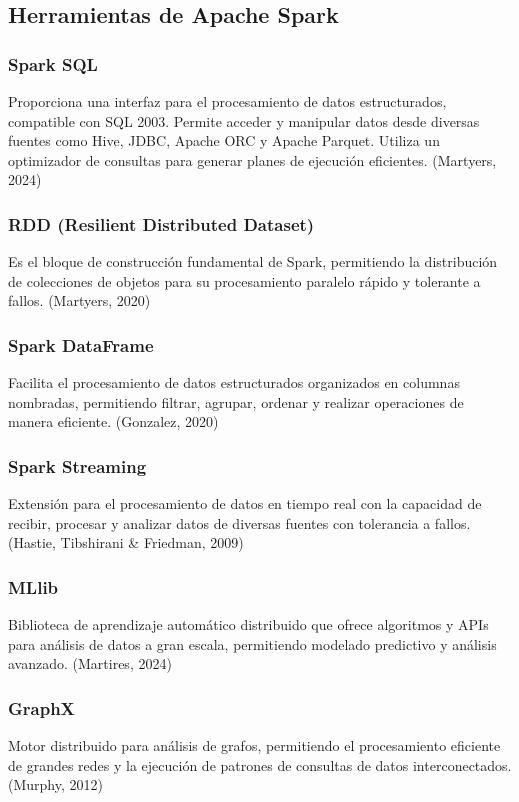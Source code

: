 	\subsection{Herramientas de Apache Spark}
	
	\subsubsection{Spark SQL}
	Proporciona una interfaz para el procesamiento de datos estructurados, compatible con SQL 2003. Permite acceder y manipular datos desde diversas fuentes como Hive, JDBC, Apache ORC y Apache Parquet. Utiliza un optimizador de consultas para generar planes de ejecución eficientes. (Martyers, 2024)
	
	\subsubsection{RDD (Resilient Distributed Dataset)}
	Es el bloque de construcción fundamental de Spark, permitiendo la distribución de colecciones de objetos para su procesamiento paralelo rápido y tolerante a fallos. (Martyers, 2020)
	
	\subsubsection{Spark DataFrame}
	Facilita el procesamiento de datos estructurados organizados en columnas nombradas, permitiendo filtrar, agrupar, ordenar y realizar operaciones de manera eficiente. (Gonzalez, 2020)
	
	\subsubsection{Spark Streaming}
	Extensión para el procesamiento de datos en tiempo real con la capacidad de recibir, procesar y analizar datos de diversas fuentes con tolerancia a fallos.(Hastie, Tibshirani \& Friedman, 2009) 
	
	\subsubsection{MLlib}
	Biblioteca de aprendizaje automático distribuido que ofrece algoritmos y APIs para análisis de datos a gran escala, permitiendo modelado predictivo y análisis avanzado. (Martires, 2024)
	
	\subsubsection{GraphX}
	Motor distribuido para análisis de grafos, permitiendo el procesamiento eficiente de grandes redes y la ejecución de patrones de consultas de datos interconectados.(Murphy, 2012) 
	
